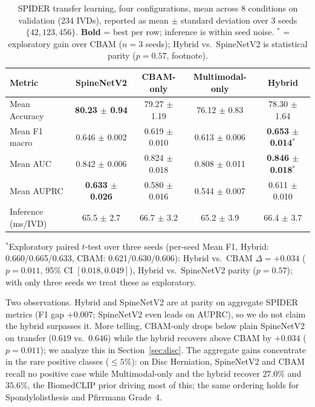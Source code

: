 \documentclass[runningheads]{llncs}
\newcommand{\best}[1]{\textbf{#1}}
\begin{document}
\begin{table}[htbp]
\centering
\caption{SPIDER transfer learning, four configurations, mean across 8 conditions on validation (234 IVDs), reported as mean $\pm$ standard deviation over 3 seeds $\{42, 123, 456\}$. \textbf{Bold} = best per row; inference is within seed noise. $^\ast$ = exploratory gain over CBAM ($n=3$ seeds); Hybrid vs.\ SpineNetV2 is statistical parity ($p=0.57$, footnote).}
\label{tab:spider_transfer_agg}
\footnotesize
\begin{tabular}{@{}lcccc@{}}
\toprule
Metric & SpineNetV2 & CBAM-only & Multimodal-only & Hybrid \\
\midrule
Mean Accuracy & \best{80.23 $\pm$ 0.94} & 79.27 $\pm$ 1.19 & 76.12 $\pm$ 0.83 & 78.30 $\pm$ 1.64 \\
Mean F1 macro & 0.646 $\pm$ 0.002 & 0.619 $\pm$ 0.010 & 0.613 $\pm$ 0.006 & \best{0.653 $\pm$ 0.014}$^\ast$ \\
Mean AUC      & 0.842 $\pm$ 0.006 & 0.824 $\pm$ 0.018 & 0.808 $\pm$ 0.011 & \best{0.846 $\pm$ 0.018}$^\ast$ \\
Mean AUPRC    & \best{0.633 $\pm$ 0.026} & 0.580 $\pm$ 0.016 & 0.544 $\pm$ 0.007 & 0.611 $\pm$ 0.010 \\
\midrule
Inference (ms/IVD) & 65.5 $\pm$ 2.7 & 66.7 $\pm$ 3.2 & 65.2 $\pm$ 3.9 & 66.4 $\pm$ 3.7 \\
\bottomrule
\end{tabular}

\vspace{2pt}
{\raggedright\scriptsize
$^\ast$Exploratory paired $t$-test over three seeds (per-seed Mean F1, Hybrid: 0.660/0.665/0.633, CBAM: 0.621/0.630/0.606): Hybrid vs.\ CBAM $\Delta=+0.034$ ($p=0.011$, 95\% CI $[0.018,0.049]$), Hybrid vs.\ SpineNetV2 parity ($p=0.57$); with only three seeds we treat these as exploratory.\par}
\end{table}

Two observations. Hybrid and SpineNetV2 are at parity on aggregate SPIDER metrics (F1 gap $+0.007$; SpineNetV2 even leads on AUPRC), so we do not claim the hybrid surpasses it. More telling, CBAM-only drops below plain SpineNetV2 on transfer ($0.619$ vs.\ $0.646$) while the hybrid recovers above CBAM by $+0.034$ ($p=0.011$); we analyze this in Section~\ref{sec:disc}. The aggregate gains concentrate in the rare positive classes ($\leq 5\%$): on Disc Herniation, SpineNetV2 and CBAM recall no positive case while Multimodal-only and the hybrid recover $27.0\%$ and $35.6\%$, the BiomedCLIP prior driving most of this; the same ordering holds for Spondylolisthesis and Pfirrmann Grade~4.
\end{document}
